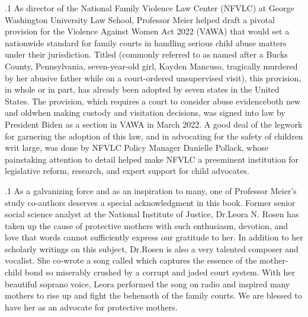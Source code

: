 \documentclass[11pt, twoside]{article}
\begin{document}
{\p.1{%
As director of the National Family Violence Law Center (NFVLC)
at George Washington University Law School, Professor Meier helped
draft a pivotal provision for the Violence Against Women Act 2022
(VAWA) that would set a nationwide standard for family courts in
handling serious child abuse matters under their jurisdiction. Titled
(commonly referred to as \mdash{}named after a Bucks County, Pennsylvania,
seven-year-old girl, Kayden Mancuso, tragically murdered by her abusive father while on a court-ordered unsupervised visit), this provision,
in whole or in part, has already been adopted by seven states in the
United States. The provision, which requires a court to consider abuse
evidence\mdash{}both new and old\mdash{}when making custody and visitation decisions, was signed into law by President Biden as a section in VAWA
in March 2022. A good deal of the legwork for garnering the adoption
of this law, and in advocating for the safety of children writ large, was
done by NFVLC Policy Manager Danielle Pollack, whose painstaking
attention to detail helped make NFVLC a preeminent institution for
legislative reform, research, and expert support for child advocates.
}%

\p.1{%
As a galvanizing force and as an inspiration to many, one of Professor Meier’s study co-authors deserves a special acknowledgment in this
book. Former senior social science analyst at the National Institute of
Justice, Dr.\@ Leora N. Rosen has taken up the cause of protective mothers
with such enthusiasm, devotion, and love that words cannot sufficiently
express our gratitude to her. In addition to her scholarly writings on this
subject, Dr.\@ Rosen is also a very talented composer and vocalist. She
co-wrote a song called \mdash{}which captures the
essence of the mother-child bond so miserably crushed by a corrupt and
jaded court system. With her beautiful soprano voice, Leora performed
the song on radio and inspired many mothers to rise up and fight the behemoth of the family courts. We are blessed to have her as an advocate
for protective mothers.
}%

}
\end{document}

